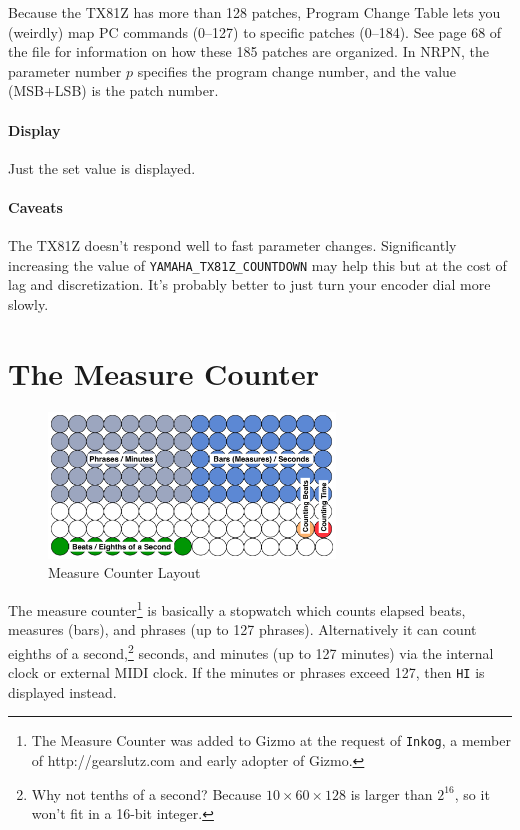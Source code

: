 \documentclass{article}
\begin{document}
Because the TX81Z has more than 128 patches, Program Change Table lets you (weirdly) map PC commands (0--127) to specific patches (0--184).  See page 68 of the file for information on how these 185 patches are organized.  In NRPN, the parameter number \(p\) specifies the program change number, and the value (MSB+LSB) is the patch number.

\paragraph{Display} Just the set value is displayed.

\paragraph{Caveats}  The TX81Z doesn't respond well to fast parameter changes.    Significantly increasing the value of \texttt{YAMAHA\_TX81Z\_COUNTDOWN} may help this but at the cost of lag and discretization.  It's probably better to just turn your encoder dial more slowly.


\clearpage

\section {The Measure Counter}
\label{measure}

\begin{figure}
\vspace{-1.5em}\includegraphics[width=3in]{measure}
\vspace{-2em}\caption{\small Measure Counter Layout}
\vspace{-1em}\label{measurecounter}
\end{figure}

	The measure counter\footnote{The Measure Counter was added to Gizmo at the request of \texttt{Inkog}, a member of http:/\!/gearslutz.com and early adopter of Gizmo.} is basically a stopwatch which counts elapsed beats, measures (bars), and phrases (up to 127 phrases).  Alternatively it can count eighths of a second,\footnote{\label{footnotetenths}Why not tenths of a second?  Because \(10 \times 60 \times 128\) is larger than \(2^{16}\), so it won't fit in a 16-bit integer.} seconds, and minutes (up to 127 minutes) via the internal clock or external MIDI clock.  If the minutes or phrases exceed 127, then \texttt{HI} is displayed instead.
	
\end{document}
